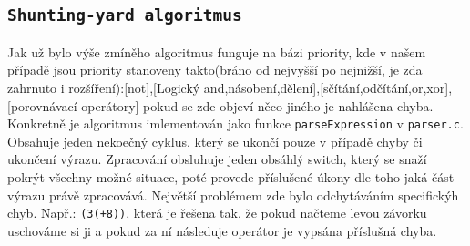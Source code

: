 \documentclass[12pt,a4paper,titlepage,final]{article}
\begin{document}
\subsection{\texttt{Shunting-yard algoritmus}}
Jak už bylo výše zmíněho algoritmus funguje na bázi priority, kde v našem případě jsou priority stanoveny takto(bráno od nejvyšší po nejnižší, je zda zahrnuto i rozšíření):[not],[Logický and,násobení,dělení],[sčítání,odčítání,or,xor],[porovnávací operátory] pokud se zde objeví něco jiného je nahlášena chyba. Konkretně je algoritmus imlementován jako funkce \verb|parseExpression| v \verb|parser.c|. Obsahuje jeden nekoečný cyklus, který se ukončí pouze v případě chyby či ukončení výrazu. Zpracování obsluhuje jeden obsáhlý switch, který se snaží pokrýt všechny možné situace, poté provede příslušené úkony dle toho jaká část výrazu právě zpracovává. Největší problémem zde bylo odchytáváním specifickýh chyb. Např.: \verb|(3(+8))|, která je řešena tak, že pokud načteme levou závorku uschováme si ji a pokud za ní následuje operátor je vypsána příslušná chyba.
\end{document}
